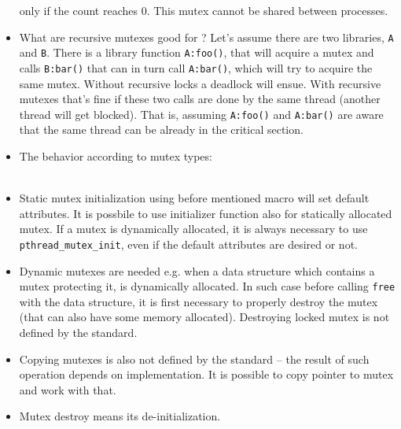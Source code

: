 \begin{itemize}
only if the count reaches 0. This mutex cannot be shared between processes.
\item What are recursive mutexes good for ? Let's assume there are two
libraries, \texttt{A} and \texttt{B}. There is a library
function \texttt{A:foo()}, that will acquire a mutex and calls \texttt{B:bar()}
that can in turn call \texttt{A:bar()}, which will try to acquire the same
mutex. Without recursive locks a deadlock will ensue. With recursive mutexes
that's fine if these two calls are done by the same thread (another thread will
get blocked). That is, assuming \texttt{A:foo()} and \texttt{A:bar()} are aware
that the same thread can be already in the critical section.
\item \label{MUTEXTAB} The behavior according to mutex types:\\
\\
\item Static mutex initialization using before mentioned macro will set default
attributes. It is possbile to use initializer function also for statically
allocated mutex. If a mutex is dynamically allocated, it is always necessary to
use \texttt{pthread\_mutex\_init}, even if the default attributes are desired or
not.
\item Dynamic mutexes are needed e.g. when a data structure which contains a
mutex protecting it, is dynamically allocated.
In such case before calling \texttt{free} with the data structure, it is first
necessary to properly destroy the mutex (that can also have some memory
allocated). Destroying locked mutex is not defined by the standard.
\item Copying mutexes is also not defined by the standard -- the result of such
operation depends on implementation. It is possible to copy pointer to mutex
and work with that.
\item Mutex destroy means its de-initialization.
\end{itemize}

